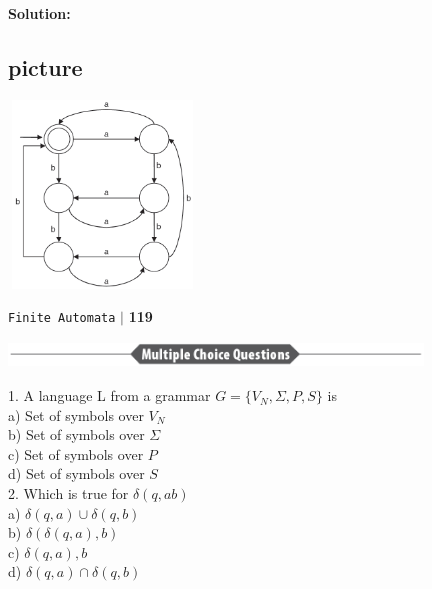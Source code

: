 \textbf{Solution:}\\
\begin{center}
	\section{picture}
	\includegraphics[width=5cm,height=5cm]{./pictures/118-2.png}
\end{center}

\begin{flushright}
	\texttt{Finite Automata} \hspace*{0.1cm}\textbf{$|$} \hspace*{0.1cm} \textbf{119}\hspace*{0.1cm}
\end{flushright}


\begin{center}
	\includegraphics[width=11cm,height=0.7cm]{./pictures/119.png}
\end{center}


1. A language L from a grammar $G = \{V_N, \Sigma,P, S\}$ is\\
\hspace*{0.5cm} a) Set of symbols over $V_N$ \\
\hspace*{0.5cm} b) Set of symbols over $\Sigma$ \\
\hspace*{0.5cm} c) Set of symbols over $P$ \\
\hspace*{0.5cm} d) Set of symbols over $S$ \\

\vspace*{0.2cm}
2. Which is true for $\delta(q, ab)$ \\
\hspace*{0.5cm} a) $\delta(q, a) \cup \delta(q, b)$ \\
\hspace*{0.5cm} b) $\delta(\delta(q, a), b)$ \\
\hspace*{0.5cm} c) $\delta(q, a), b$ \\
\hspace*{0.5cm} d) $\delta(q, a) \cap \delta(q, b)$ \\

